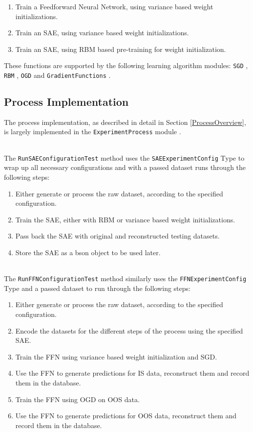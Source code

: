 \documentclass[a4paper,11pt,oneside]{article}
\theoremstyle{plain}
\theoremstyle{definition}
\begin{document}
	\begin{enumerate}
		\item Train a Feedforward Neural Network, using variance based weight initializations.
		\item Train an SAE, using variance based weight initializations.
		\item Train an SAE, using RBM based pre-training for weight initialization.
	\end{enumerate}
	
	These functions are supported by the following learning algorithm modules: \texttt{SGD} \citep{DCSGD}, \texttt{RBM} \citep{DCRBM}, \texttt{OGD} \citep{DCOGD} and  \texttt{GradientFunctions} \citep{DCGradientFunctions}.
	
	\subsection{Process Implementation}
	
	The process implementation, as described in detail in Section \ref{ProcessOverview}, is largely implemented in the \texttt{ExperimentProcess} module \citep{DCExperimentProcess}.
	
	~\\
	The \texttt{RunSAEConfigurationTest} method uses the \texttt{SAEExperimentConfig} Type to wrap up all necessary configurations and with a passed dataset runs through the following steps:
	\begin{enumerate}
		\item Either generate or process the raw dataset, according to the specified configuration.
		\item Train the SAE, either with RBM or variance based weight initializations.
		\item Pass back the SAE with original and reconstructed testing datasets.
		\item Store the SAE as a bson object to be used later.
	\end{enumerate}
	
	~\\
	The \texttt{RunFFNConfigurationTest} method similarly uses the \texttt{FFNExperimentConfig} Type and a passed dataset to run through the following steps:
	\begin{enumerate}
		\item Either generate or process the raw dataset, according to the specified configuration.
		\item Encode the datasets for the different steps of the process using the specified SAE.
		\item Train the FFN using variance based weight initialization and SGD.
		\item Use the FFN to generate predictions for IS data, reconstruct them and record them in the database.
		\item Train the FFN using OGD on OOS data.
		\item Use the FFN to generate predictions for OOS data, reconstruct them and record them in the database.
	\end{enumerate}
	
\end{document}
